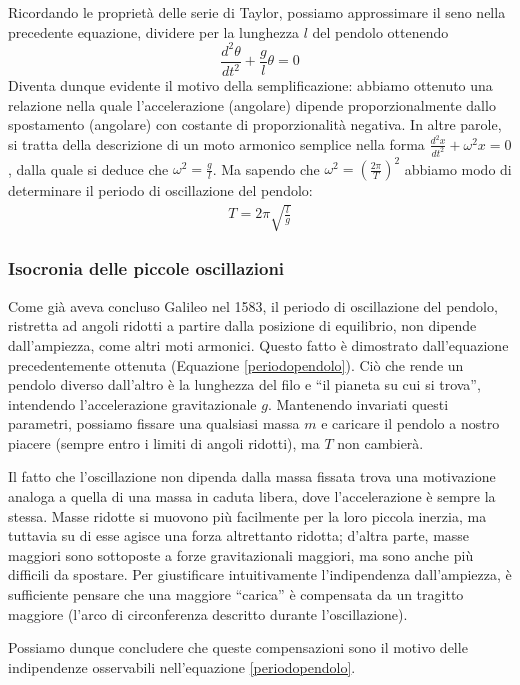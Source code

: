 Ricordando le proprietà delle serie di Taylor, possiamo approssimare
il seno nella precedente equazione, dividere per la lunghezza $l$ del
pendolo ottenendo
\[ \frac{d^2\theta}{dt^2} + \frac{g}{l}\theta = 0 \]
Diventa dunque evidente il motivo della semplificazione: abbiamo ottenuto
una relazione nella quale l'accelerazione (angolare) dipende proporzionalmente
dallo spostamento (angolare) con costante di proporzionalità negativa.
In altre parole, si tratta della descrizione di un moto armonico semplice
nella forma $\frac{d^2x}{dt^2} + \omega^2 x = 0$, dalla quale si deduce
che $\omega^2 = \frac{g}{l}$. Ma sapendo che $\omega^2 = (\frac{2\pi}{T})^2$
abbiamo modo di determinare il periodo di oscillazione del pendolo:
\begin{align}
    T = 2\pi\sqrt{\frac{l}{g}}
    \label{periodopendolo}
\end{align}


\subsubsection*{Isocronia delle piccole oscillazioni}
Come già aveva concluso Galileo nel 1583, il periodo di oscillazione
del pendolo, ristretta ad angoli ridotti a partire dalla posizione
di equilibrio, non dipende dall'ampiezza, come altri moti armonici.
Questo fatto è dimostrato dall'equazione precedentemente ottenuta
(Equazione \ref{periodopendolo}). Ciò che rende un pendolo diverso
dall'altro è la lunghezza del filo e ``il pianeta su cui si trova'',
intendendo l'accelerazione gravitazionale $g$. Mantenendo invariati
questi parametri, possiamo fissare una qualsiasi massa $m$ e caricare
il pendolo a nostro piacere (sempre entro i limiti di angoli ridotti),
ma $T$ non cambierà.

Il fatto che l'oscillazione non dipenda dalla massa fissata trova una
motivazione analoga a quella di una massa in caduta libera, dove
l'accelerazione è sempre la stessa. Masse ridotte si muovono più
facilmente per la loro piccola inerzia, ma tuttavia su di esse agisce
una forza altrettanto ridotta; d'altra parte, masse maggiori sono
sottoposte a forze gravitazionali maggiori, ma sono anche più difficili
da spostare.
Per giustificare intuitivamente l'indipendenza dall'ampiezza, è
sufficiente pensare che una maggiore ``carica'' è compensata da un
tragitto maggiore (l'arco di circonferenza descritto durante
l'oscillazione).

Possiamo dunque concludere che queste compensazioni sono il motivo
delle indipendenze osservabili nell'equazione \ref{periodopendolo}.

